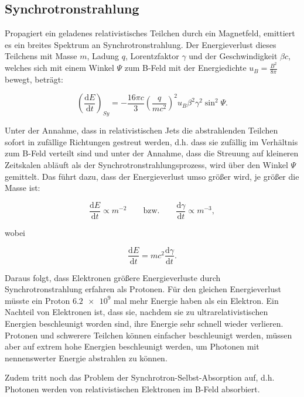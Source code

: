 \subsection{Synchrotronstrahlung}
Propagiert ein geladenes relativistisches Teilchen durch ein Magnetfeld, emittiert es ein breites Spektrum an Synchrotronstrahlung.
Der Energieverlust dieses Teilchens mit Masse $m$, Ladung $q$, Lorentzfaktor $\gamma$ und der Geschwindigkeit $\beta c$, welches sich mit einem Winkel $\Psi$ zum B-Feld mit der Energiedichte $u_B=\frac{B^2}{8\pi}$ bewegt, beträgt:

\begin{equation}
 \left( \frac{\mathrm{d}E}{\mathrm{d}t} \right)_{Sy} = - \frac{16 \pi c}{3} \left(\frac{q}{mc^2} \right)^2 u_B \beta^2 \gamma^2 \sin^2{\Psi}.
\end{equation}

Unter der Annahme, dass in relativistischen Jets die abstrahlenden Teilchen sofort in zufällige Richtungen gestreut werden, d.h. dass sie zufällig im Verhältnis zum B-Feld verteilt sind und unter der Annahme, dass die Streuung auf kleineren Zeitskalen abläuft als der Synchrotronstrahlungsprozess, wird über den Winkel $\Psi$ gemittelt.
Das führt dazu, dass der Energieverlust umso größer wird, je größer die Masse ist:

\begin{equation}
 \frac{\mathrm{d}E}{\mathrm{d}t}\propto m^{-2} \qquad \text{bzw.} \qquad \frac{\mathrm{d}\gamma}{\mathrm{d}t}\propto m^{-3},
\end{equation}

wobei 

\begin{equation}
 \frac{\mathrm{d}E}{\mathrm{d}t} = mc^2 \frac{\mathrm{d}\gamma}{\mathrm{d}t}.
\end{equation}

Daraus folgt, dass Elektronen größere Energieverluste durch Synchrotronstrahlung erfahren als Protonen.
Für den gleichen Energieverlust müsste ein Proton $\num{6,2e9}$ mal mehr Energie haben als ein Elektron.
Ein Nachteil von Elektronen ist, dass sie, nachdem sie zu ultrarelativistischen Energien beschleunigt worden sind, ihre Energie sehr schnell wieder verlieren.
Protonen und schwerere Teilchen können einfacher beschleunigt werden,  müssen aber auf extrem hohe Energien beschleunigt werden, um Photonen mit nennenswerter Energie abstrahlen zu können.

Zudem tritt noch das Problem der Synchrotron-Selbst-Absorption auf, d.h. Photonen werden von relativistischen Elektronen im B-Feld absorbiert.\cite{RelativisticJets}

